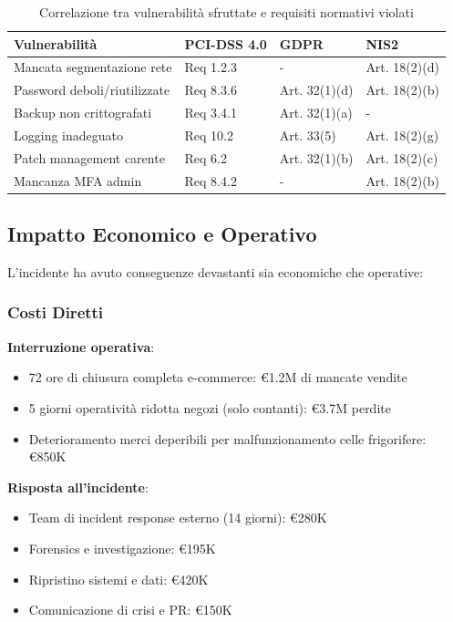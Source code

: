 \begin{table}[h]
\centering
\caption[Correlazione vulnerabilità-requisiti normativi violati]{Correlazione tra vulnerabilità sfruttate e requisiti normativi violati}
\label{tab:vulnerabilita_requisiti}
\small
\begin{tabularx}{\textwidth}{|X|X|X|X|}
\hline
\textbf{Vulnerabilità} & \textbf{PCI-DSS 4.0} & \textbf{GDPR} & \textbf{NIS2} \\
\hline
Mancata segmentazione rete & Req 1.2.3 & - & Art. 18(2)(d) \\
\hline
Password deboli/riutilizzate & Req 8.3.6 & Art. 32(1)(d) & Art. 18(2)(b) \\
\hline
Backup non crittografati & Req 3.4.1 & Art. 32(1)(a) & - \\
\hline
Logging inadeguato & Req 10.2 & Art. 33(5) & Art. 18(2)(g) \\
\hline
Patch management carente & Req 6.2 & Art. 32(1)(b) & Art. 18(2)(c) \\
\hline
Mancanza MFA admin & Req 8.4.2 & - & Art. 18(2)(b) \\
\hline
\end{tabularx}
\end{table}

\subsection{Impatto Economico e Operativo}
\label{subsec:4.8.2_impatto}

L'incidente ha avuto conseguenze devastanti sia economiche che operative:

\subsubsection{Costi Diretti}

\textbf{Interruzione operativa}: 
\begin{itemize}
    \item 72 ore di chiusura completa e-commerce: €1.2M di mancate vendite
    \item 5 giorni operatività ridotta negozi (solo contanti): €3.7M perdite
    \item Deterioramento merci deperibili per malfunzionamento celle frigorifere: €850K
\end{itemize}

\textbf{Risposta all'incidente}:
\begin{itemize}
    \item Team di incident response esterno (14 giorni): €280K
    \item Forensics e investigazione: €195K
    \item Ripristino sistemi e dati: €420K
    \item Comunicazione di crisi e PR: €150K
\end{itemize}

